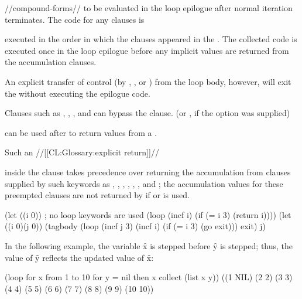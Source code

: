 //compound-forms//
to be evaluated
in the loop epilogue after normal iteration terminates.
  The code for any  clauses is 

executed
 in the order in which the clauses appeared in
  the .  The collected code is executed once in the loop epilogue
  before any implicit values are returned from the accumulation clauses.

An explicit transfer of control (\eg by , , or )
from the loop body, however, will exit the 
   without executing the epilogue code.


 
Clauses such as , , , and 
can bypass the  clause.
 (or , if the  option was supplied)

can be used after  to return values from a .  

Such an //[[CL:Glossary:explicit return]]//

inside the
 clause takes precedence over returning the accumulation
from clauses supplied by such keywords as , , 
, , , , and 
; 
the accumulation values for these preempted clauses are not returned by 
 if  or  is used.
 








\endsubsubsection%

\endsubsection%


\code
 (let ((i 0))                     ; no loop keywords are used
    (loop (incf i) (if (= i 3) (return i)))) 
 (let ((i 0)(j 0))
    (tagbody
      (loop (incf j 3) (incf i) (if (= i 3) (go exit)))
      exit)
    j) 
\endcode


In the following example, the variable \f{x} is stepped
before \f{y} is stepped; thus, the value of \f{y}
reflects the updated value of \f{x}:
 
\code
 (loop for x from 1 to 10 
       for y = nil then x 
       collect (list x y))
\EV ((1 NIL) (2 2) (3 3) (4 4) (5 5) (6 6) (7 7) (8 8) (9 9) (10 10))
\endcode
 
